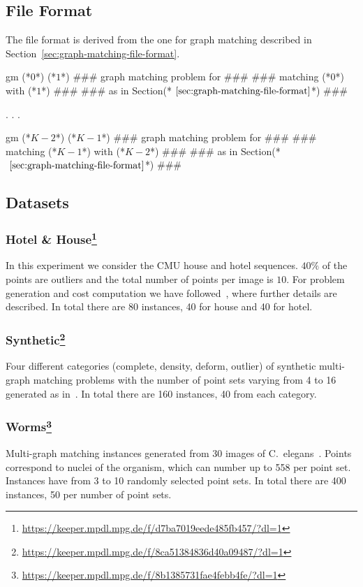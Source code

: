 \subsection{File Format}
The file format is derived from the one for graph matching described in Section~\ref{sec:graph-matching-file-format}.

\begin{fileformat}
gm (*$0$*) (*$1$*)
### graph matching problem for ###
### matching (*$0$*) with (*$1$*) ###
### as in Section(*$\text{~\ref{sec:graph-matching-file-format}}$*) ###

.
.
.

gm (*$K-2$*) (*$K-1$*)
### graph matching problem for ###
### matching (*$K-1$*) with (*$K-2$*) ###
### as in Section(*$\text{~\ref{sec:graph-matching-file-format}}$*) ###
\end{fileformat}

\subsection{Datasets}

\subsubsection[Hotel \& House]{Hotel \& House\footnote{\url{https://keeper.mpdl.mpg.de/f/d7ba7019eede485fb457/?dl=1}}}
In this experiment we consider the CMU house and hotel sequences.
$40\%$ of the points are outliers and the total number of points per image is $10$. 
For problem generation and cost computation we have followed~\cite{yan2015multi}, where further details are described.
In total there are 80 instances, 40 for house and 40 for hotel.

\subsubsection[Synthetic]{Synthetic\footnote{\url{https://keeper.mpdl.mpg.de/f/8ca51384836d40a09487/?dl=1}}}
Four different categories (complete, density, deform, outlier) of synthetic multi-graph matching problems with the number of point sets varying from 4 to 16 generated as in~\cite{yan2015multi}.
In total there are 160 instances, 40 from each category.

\subsubsection[Worms]{Worms\footnote{\url{https://keeper.mpdl.mpg.de/f/8b1385731fae4febb4fe/?dl=1}}}
Multi-graph matching instances generated from 30 images of C.\ elegans~\cite{kainmueller2014active}.
Points correspond to nuclei of the organism, which can number up to 558 per point set.
Instances have from 3 to 10 randomly selected point sets.
In total there are 400 instances, 50 per number of point sets.

